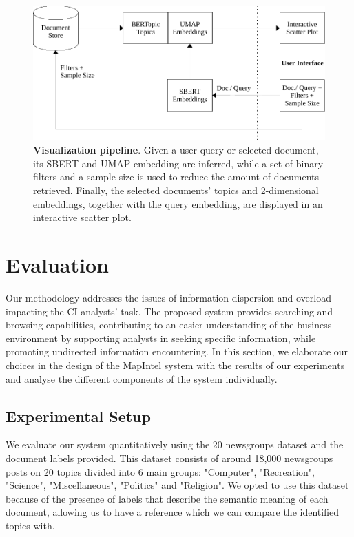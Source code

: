 \documentclass[a4paper]{article}
\begin{document}
\begin{figure}[H]
  \centering
  \includegraphics[scale=0.7]{./assets/vis_pipeline}
  \caption{\textbf{Visualization pipeline}. Given a user query or selected document, its SBERT and UMAP embedding are inferred, while a set of binary filters and a sample size is used to reduce the amount of documents retrieved. Finally, the selected documents' topics and 2-dimensional embeddings, together with the query embedding, are displayed in an interactive scatter plot.}
  \label{vis_pipeline}
\end{figure}

\section{Evaluation}
Our methodology addresses the issues of information dispersion and overload impacting the CI analysts' task. The proposed system provides searching and browsing capabilities, contributing to an easier understanding of the business environment by supporting analysts in seeking specific information, while promoting undirected information encountering. In this section, we elaborate our choices in the design of the MapIntel system with the results of our experiments and analyse the different components of the system individually.

\subsection{Experimental Setup}
We evaluate our system quantitatively using the 20 newsgroups \citep{pedregosa2011} dataset and the document labels provided. This dataset consists of around 18,000 newsgroups posts on 20 topics divided into 6 main groups: "Computer", "Recreation", "Science", "Miscellaneous", "Politics" and "Religion". We opted to use this dataset because of the presence of labels that describe the semantic meaning of each document, allowing us to have a reference which we can compare the identified topics with.
\end{document}
